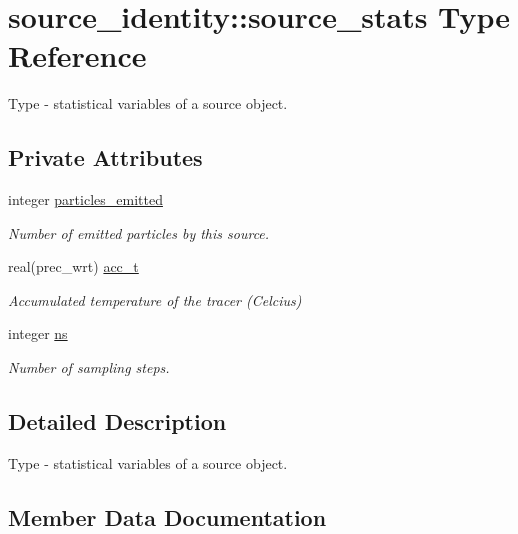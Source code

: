 \hypertarget{structsource__identity_1_1source__stats}{}\section{source\+\_\+identity\+:\+:source\+\_\+stats Type Reference}
\label{structsource__identity_1_1source__stats}


Type -\/ statistical variables of a source object.  


\subsection*{Private Attributes}
\begin{DoxyCompactItemize}
\item 
integer \mbox{\hyperlink{structsource__identity_1_1source__stats_a1b11065093e55320520604392399d1c9}{particles\+\_\+emitted}}
\begin{DoxyCompactList}\small\item\em Number of emitted particles by this source. \end{DoxyCompactList}\item 
real(prec\+\_\+wrt) \mbox{\hyperlink{structsource__identity_1_1source__stats_a76eafb42aad8f5a2a859f12c0fd6f683}{acc\+\_\+t}}
\begin{DoxyCompactList}\small\item\em Accumulated temperature of the tracer (Celcius) \end{DoxyCompactList}\item 
integer \mbox{\hyperlink{structsource__identity_1_1source__stats_a0d1e978cf3224049d1c15b23b8d16fa7}{ns}}
\begin{DoxyCompactList}\small\item\em Number of sampling steps. \end{DoxyCompactList}\end{DoxyCompactItemize}


\subsection{Detailed Description}
Type -\/ statistical variables of a source object. 

\subsection{Member Data Documentation}
\mbox{\label{structsource__identity_1_1source__stats_a76eafb42aad8f5a2a859f12c0fd6f683}} 
